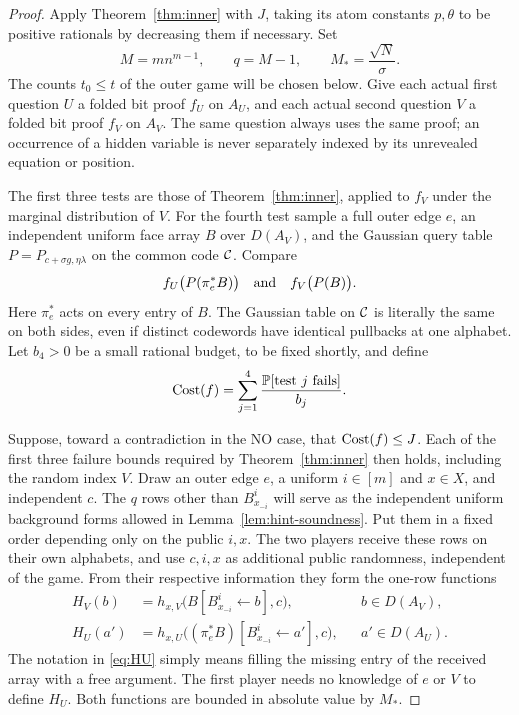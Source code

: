 \begin{proof}
Apply Theorem~\ref{thm:inner} with $J$, taking its atom constants $p,\theta$
to be positive rationals by decreasing them if necessary. Set
\[
 M=mn^{m-1},\qquad q=M-1,\qquad M_*=\frac{\sqrt N}{\sigma}.
\]
The counts $t_0\le t$ of the outer game will be chosen below. Give each actual
first question $U$ a folded bit proof $f_U$ on $A_U$, and each actual second
question $V$ a folded bit proof $f_V$ on $A_V$. The same question always uses
the same proof; an occurrence of a hidden variable is never separately
indexed by its unrevealed equation or position.

The first three tests are those of Theorem~\ref{thm:inner}, applied to $f_V$
under the marginal distribution of $V$. For the fourth test sample a full
outer edge $e$, an independent uniform face array $B$ over $D(A_V)$, and the
Gaussian query table $P=P_{c+\sigma g,\eta\lambda}$ on the common code $\mathcal C$.
Compare
\begin{equation}\label{eq:fourth-test}
 f_U\bigl(P(\pi_e^*B)\bigr)
 \quad\hbox{and}\quad
 f_V\bigl(P(B)\bigr).
\end{equation}
Here $\pi_e^*$ acts on every entry of $B$. The Gaussian table on $\mathcal C$ is
literally the same on both sides, even if distinct codewords have identical
pullbacks at one alphabet. Let $b_4>0$ be a small rational budget, to be fixed
shortly, and define
\[
 \operatorname{Cost}(f)=\sum_{j=1}^4\frac{\mathbb P[\text{test $j$ fails}]}{b_j}.
\]

Suppose, toward a contradiction in the NO case, that $\operatorname{Cost}(f)\le J$.
Each of the first three failure bounds required by Theorem~\ref{thm:inner}
then holds, including the random index $V$. Draw an outer edge $e$, a uniform
$i\in[m]$ and $x\in X$, and independent $c$. The $q$ rows other than
$B^i_{x_{-i}}$ will serve as the independent uniform background forms allowed
in Lemma~\ref{lem:hint-soundness}. Put them in a fixed order depending only on
the public $i,x$. The two players receive these rows on their own alphabets,
and use $c,i,x$ as additional public randomness, independent of the game.
From their respective information they form the one-row functions
\begin{align}
 H_V(b)&=h_{x,V}\bigl(B[B^i_{x_{-i}}\leftarrow b],c\bigr),
      &&b\in D(A_V),\label{eq:HV}\\
 H_U(a')&=h_{x,U}\bigl((\pi_e^*B)
                 [B^i_{x_{-i}}\leftarrow a'],c\bigr),
      &&a'\in D(A_U).\label{eq:HU}
\end{align}
The notation in \eqref{eq:HU} simply means filling the missing entry of the
received array with a free argument. The first player needs no knowledge of
$e$ or $V$ to define $H_U$. Both functions are bounded in absolute value by
$M_*$.


\end{proof}
